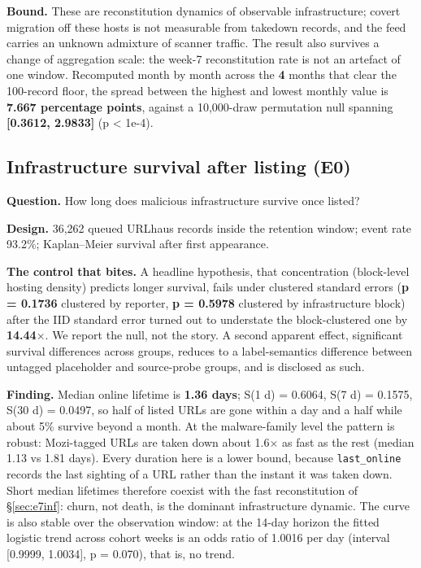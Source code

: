 \textbf{Bound.} These are reconstitution dynamics of observable infrastructure;
covert migration off these hosts is not measurable from takedown records, and
the feed carries an unknown admixture of scanner traffic. The result also
survives a change of aggregation scale: the week-7 reconstitution rate is not an
artefact of one window. Recomputed month by month across the \textbf{4} months
that clear the 100-record floor, the spread between the highest and lowest
monthly value is \textbf{7.667 percentage points}, against a 10,000-draw
permutation null spanning \textbf{[0.3612, 2.9833]} (p \textless{} 1e-4).

\subsection{Infrastructure survival after listing (E0)}

\textbf{Question.} How long does malicious infrastructure survive once listed?

\textbf{Design.} 36,262 queued URLhaus records inside the retention window;
event rate 93.2\%; Kaplan--Meier survival after first appearance.

\textbf{The control that bites.} A headline hypothesis, that concentration
(block-level hosting density) predicts longer survival, fails under clustered
standard errors (\textbf{p = 0.1736} clustered by reporter, \textbf{p = 0.5978}
clustered by infrastructure block) after the IID standard error turned out to
understate the block-clustered one by \textbf{14.44$\times$}. We report the
null, not the story. A second apparent effect, significant survival differences
across groups, reduces to a label-semantics difference between untagged
placeholder and source-probe groups, and is disclosed as such.

\textbf{Finding.} Median online lifetime is \textbf{1.36 days}; S(1 d) = 0.6064,
S(7 d) = 0.1575, S(30 d) = 0.0497, so half of listed URLs are gone within a day
and a half while about 5\% survive beyond a month. At the malware-family level
the pattern is robust: Mozi-tagged URLs are taken down about 1.6$\times$ as fast
as the rest (median 1.13 vs 1.81 days). Every duration here is a lower bound,
because \texttt{last\_online} records the last sighting of a URL rather than the
instant it was taken down. Short median lifetimes therefore coexist with the fast
reconstitution of \S\ref{sec:e7inf}: churn, not death, is the dominant
infrastructure dynamic. The curve is also stable over the observation window:
at the 14-day horizon the fitted logistic trend across cohort weeks is an odds
ratio of 1.0016 per day (interval [0.9999, 1.0034], p = 0.070), that is, no
trend.

